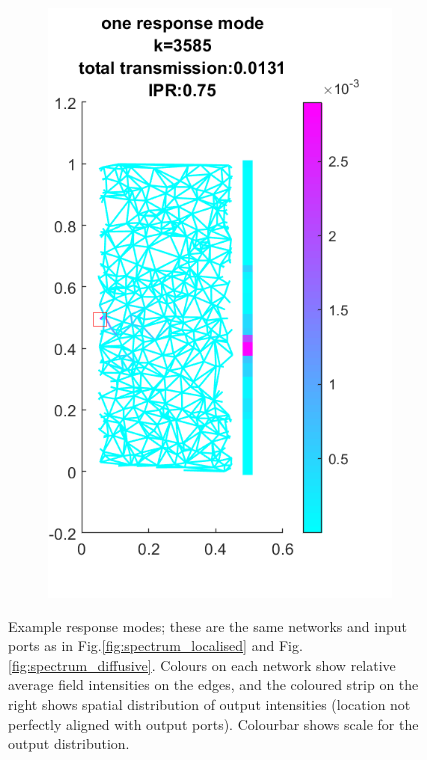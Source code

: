\begin{figure}[h]
\begin{subfigure}[b]{0.4\textwidth}
        \includegraphics[width=\textwidth]{ch3/fig3/response_mode_N500D05d.png}
    \end{subfigure}
    \caption{Example response modes; these are the same networks and input ports as in Fig.\ref{fig:spectrum_localised} and Fig.\ref{fig:spectrum_diffusive}. Colours on each network show relative average field intensities on the edges, and the coloured strip on the right shows spatial distribution of output intensities (location not perfectly aligned with output ports). Colourbar shows scale for the output distribution.}\label{fig:response_mode_examples}
\end{figure}


